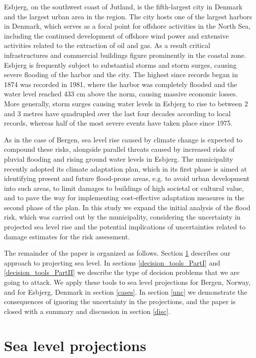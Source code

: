 \documentclass[draft,linenumbers]{agujournal}
\begin{document}
Esbjerg, on the southwest coast of Jutland, is the fifth-largest city in Denmark and the largest urban area in the region. The city hosts one of the largest harbors  in Denmark, which serves as a focal point for offshore activities in the North Sea, including the continued development of offshore wind power and extensive activities related to the extraction of oil and gas. As a result critical infrastructures and commercial buildings figure prominently in the coastal zone. Esbjerg is frequently subject to substantial storms and storm surges, causing severe flooding of the harbor and the city. The highest since records began in 1874 was recorded in 1981, where the harbor was completely flooded and the water level reached  433 cm above the norm, causing massive economic losses.  More generally, storm surges causing water levels in Esbjerg to rise to between 2 and 3 metres have quadrupled over the last four decades according to local records, whereas half of the most severe events have taken place since 1975.

As in the case of Bergen, sea level rise caused by climate change is expected to compound these risks, alongside parallel threats caused by increased risks of pluvial flooding and rising ground water levels in Esbjerg. The municipality recently adopted its climate adaptation plan, which in its first phase is aimed at identifying present and future flood-prone areas, e.g. to avoid urban development into such areas, to limit damages to buildings of high societal or cultural value, and to pave the way for implementing cost-effective adaptation measures in the second phase of the plan. In this study we expand the initial analysis of the flood risk, which was carried out by the municipality, considering the uncertainty in projected sea level rise and the potential implications of uncertainties related to damage estimates for the risk assessment.

The remainder of the paper is organized as follows. Section \ref{sealevelproj} describes our approach to projecting sea level. In sections \ref{decision_tools_PartI} and \ref{decision_tools_PartII} we describe the type of decision problems that we are going to attack. We apply these tools to sea level projections for Bergen, Norway, and for Esbjerg, Denmark in section \ref{cases}. In section \ref{unc} we demonstrate the consequences of ignoring the uncertainty in the projections, and the paper is closed with a summary and discussion in section \ref{disc}.

\section{Sea level projections}
\label{sealevelproj}
\end{document}
